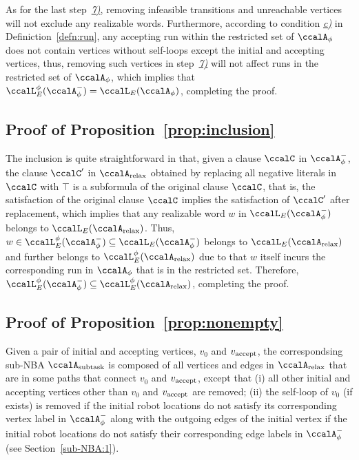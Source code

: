 \documentclass[Afour,sageh,times]{sagej}
\newcommand{\auto}[1]{\ccalA_{\textup{#1}}}
\newcommand{\autop}{\ccalA_{\phi}}
\newcommand{\vertex}[1]{v_{\textup{#1}}}
\begin{document}
{{{%
As for the last step~\hyperref[prune:infeasible]{\it 7)}, removing infeasible transitions and unreachable vertices will not exclude any realizable words. Furthermore, according to condition \hyperref[cond:c]{\it c)} in Definiction~\ref{defn:run}, any accepting run within the restricted set of $\autop$ does not contain vertices without self-loops except the initial and accepting vertices, thus, removing such vertices in step~\hyperref[prune:infeasible]{\it 7)} will not affect runs in the restricted set of $\autop$, which implies that $\ccalL^\phi_E(\autop^-) = \ccalL_E(\autop)$, completing the proof.
\subsection{Proof of Proposition~\ref{prop:inclusion}}\label{app:inclusion}
The inclusion is quite straightforward in that, given a clause $\ccalC$ in $\autop^-$, the clause $\ccalC'$ in $\auto{relax}$ obtained by replacing all negative literals in $\ccalC$ with $\top$ is a subformula of the original clause $\ccalC$, that is, the satisfaction of the original clause $\ccalC$ implies the satisfaction of $\ccalC'$ after replacement, which implies that any realizable word $w$ in $\ccalL_E(\autop^-)$ belongs to $\ccalL_E(\auto{relax})$. Thus, $w \in \ccalL^\phi_E(\autop^-)  \subseteq  \ccalL_E(\autop^-)$ belongs to $\ccalL_E(\auto{relax})$ and further belongs to $ \ccalL^\phi_E(\auto{relax})$ due to that $w$ itself incurs the corresponding run in $\autop$ that is in the restricted set. Therefore,  $\ccalL^\phi_E(\autop^-)\subseteq \ccalL^\phi_E(\auto{relax})$, completing the proof.

\subsection{Proof of Proposition~\ref{prop:nonempty}}\label{app:nonempty}
Given a pair of initial and accepting vertices, $v_0$ and $\vertex{accept}$, the correspondsing sub-NBA $\auto{subtask}$ is composed of all vertices and edges in $\auto{relax}$ that are in some paths that connect $v_0$ and $\vertex{accept}$, except that (i) all other initial and accepting vertices other than $v_0$ and $\vertex{accept}$ are removed; (ii) the self-loop of
$v_0$ (if exists) is removed if the initial robot locations do not satisfy its corresponding vertex label in $\autop^-$ along with the outgoing edges of the initial vertex if the initial robot locations do not satisfy their corresponding edge labels in $\autop^-$ (see Section~\ref{sub-NBA:1}).

}}}
\end{document}
